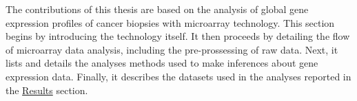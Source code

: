 The contributions of this thesis are based on the analysis of global gene
expression profiles of cancer biopsies with microarray technology.  This section
begins by introducing the technology itself.  It then proceeds by detailing the
flow of microarray data analysis, including the pre-prossessing of raw data.
Next, it lists and details the analyses methods used to make inferences about
gene expression data. Finally, it describes the datasets used in the analyses
reported in the \hyperref[chap:results]{\textsf{Results}} section.




